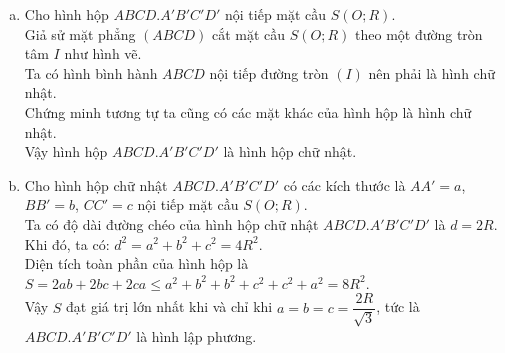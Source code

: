 \begin{bt}
{\begin{center}
\end{center}
\begin{enumerate}[a)]
	\item Cho hình hộp $ABCD.A'B'C'D'$ nội tiếp mặt cầu $S(O;R)$.\\
			Giả sử mặt phẳng $(ABCD)$ cắt mặt cầu $S(O;R)$ theo một đường tròn tâm $I$ như hình vẽ.\\
			Ta có hình bình hành $ABCD$ nội tiếp đường tròn $(I)$ nên phải là hình chữ nhật.\\
			Chứng minh tương tự ta cũng có các mặt khác của hình hộp là hình chữ nhật.\\
			Vậy hình hộp $ABCD.A'B'C'D'$ là hình hộp chữ nhật.
	\item Cho hình hộp chữ nhật $ABCD.A'B'C'D'$ có các kích thước là $AA' = a$, $BB' = b$, $CC' = c$ nội tiếp mặt cầu $S(O;R)$.\\
			Ta có độ dài đường chéo của hình hộp chữ nhật $ABCD.A'B'C'D'$ là $d = 2R$.\\
			Khi đó, ta có: $d^2 = a^2 + b^2 + c^2 = 4R^2$.\\
			Diện tích toàn phần của hình hộp là $S = 2ab + 2bc + 2ca \leq a^2 + b^2 + b^2 + c^2 + c^2 + a^2 = 8R^2$.\\
			Vậy $S$ đạt giá trị lớn nhất khi và chỉ khi $a = b = c = \dfrac{2R}{\sqrt{3}}$, tức là $ABCD.A'B'C'D'$ là hình lập phương.
\end{enumerate}
}
\end{bt}

